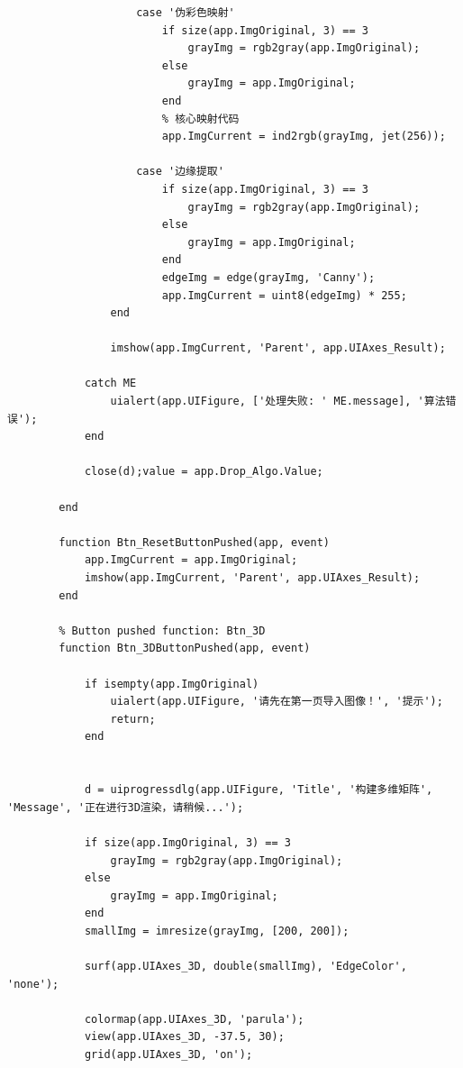 \documentclass[UTF8, a4paper, 11pt]{ctexart}
\begin{document}
\begin{lstlisting}
                    case '伪彩色映射'
                        if size(app.ImgOriginal, 3) == 3
                            grayImg = rgb2gray(app.ImgOriginal);
                        else
                            grayImg = app.ImgOriginal;
                        end
                        % 核心映射代码
                        app.ImgCurrent = ind2rgb(grayImg, jet(256));
                        
                    case '边缘提取'
                        if size(app.ImgOriginal, 3) == 3
                            grayImg = rgb2gray(app.ImgOriginal);
                        else
                            grayImg = app.ImgOriginal;
                        end
                        edgeImg = edge(grayImg, 'Canny');
                        app.ImgCurrent = uint8(edgeImg) * 255; 
                end
                
                imshow(app.ImgCurrent, 'Parent', app.UIAxes_Result);
                
            catch ME
                uialert(app.UIFigure, ['处理失败: ' ME.message], '算法错误');
            end
            
            close(d);value = app.Drop_Algo.Value;
            
        end

        function Btn_ResetButtonPushed(app, event)
            app.ImgCurrent = app.ImgOriginal; 
            imshow(app.ImgCurrent, 'Parent', app.UIAxes_Result); 
        end

        % Button pushed function: Btn_3D
        function Btn_3DButtonPushed(app, event)
            
            if isempty(app.ImgOriginal)
                uialert(app.UIFigure, '请先在第一页导入图像！', '提示');
                return;
            end
            
            
            d = uiprogressdlg(app.UIFigure, 'Title', '构建多维矩阵', 'Message', '正在进行3D渲染，请稍候...');
            
            if size(app.ImgOriginal, 3) == 3
                grayImg = rgb2gray(app.ImgOriginal);
            else
                grayImg = app.ImgOriginal;
            end
            smallImg = imresize(grayImg, [200, 200]); 
            
            surf(app.UIAxes_3D, double(smallImg), 'EdgeColor', 'none');
            
            colormap(app.UIAxes_3D, 'parula'); 
            view(app.UIAxes_3D, -37.5, 30);    
            grid(app.UIAxes_3D, 'on');     
            

\end{lstlisting}
\end{document}
